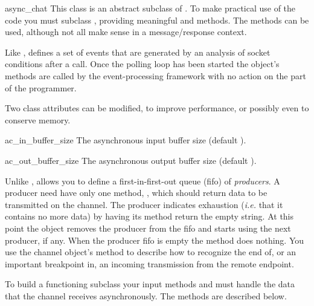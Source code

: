 \begin{classdesc}{async_chat}{}
  This class is an abstract subclass of . To make
  practical use of the code you must subclass , providing
  meaningful  and 
  methods. The  methods can be
  used, although not all make sense in a message/response context.  

  Like ,  defines a set of events
  that are generated by an analysis of socket conditions after a
   call. Once the polling loop has been started the
   object's methods are called by the event-processing
  framework with no action on the part of the programmer.

  Two class attributes can be modified, to improve performance,
  or possibly even to conserve memory.

  \begin{datadesc}{ac_in_buffer_size}
  The asynchronous input buffer size (default ).
  \end{datadesc}

  \begin{datadesc}{ac_out_buffer_size}
  The asynchronous output buffer size (default ).
  \end{datadesc}

  Unlike ,  allows you to define
  a first-in-first-out queue (fifo) of \emph{producers}. A producer need have
  only one method, , which should return data to be transmitted
  on the channel. The producer indicates exhaustion (\emph{i.e.} that it contains
  no more data) by having its  method return the empty string. At
  this point the  object removes the producer from the fifo
  and starts using the next producer, if any. When the producer fifo is empty
  the  method does nothing. You use the channel object's
   method to describe how to recognize the end
  of, or an important breakpoint in, an incoming transmission from the
  remote endpoint.

  To build a functioning  subclass your 
  input methods  and
   must handle the data that the channel receives
  asynchronously. The methods are described below.
\end{classdesc}

